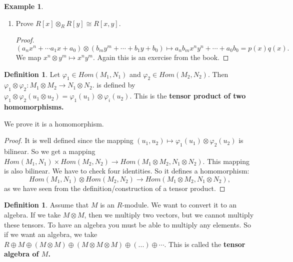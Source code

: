 \documentclass[12pt]{amsbook}
\theoremstyle{plain}
\numberwithin{section}{chapter}
\numberwithin{equation}{chapter}
\theoremstyle{definition}
\newtheorem{Def}[theorem]{Definition}
\newtheorem{Ex}[theorem]{Example}
\theoremstyle{remark}
\newcommand{\tens}{\otimes}
\renewcommand{\phi}{\varphi}
\begin{document}
\begin{Ex}
\begin{enumerate}
\begin{proof}
You need to check something like this:
$$
(\alpha_1 \tens (a_1x^n + \cdots + a_1x + a_0)) \cdot (\alpha_2 \tens (...)).
$$
The map would be given by: 
$$
\alpha_1 \tens (a_1x^n + \cdots + a_1x + a_0)\mapsto a_n\alpha x^n + \cdots a_1 \alpha x + a_0\alpha.
$$
Here it is just defined for simple tensors. So any polynomial of $S$ is the image of some tensor, since we have:
$$
\alpha_n \tens x^n + \cdots + \alpha_1 \tens x + \alpha_0 \tens 1 \mapsto \alpha_nx^n + \cdots + \alpha_1 x + \alpha_0.
$$
\end{proof}

\item Prove $R[x] \tens_R R[y] \cong R[x,y]$. 

\begin{proof}
$$
(a_nx^n + \cdots a_1 x + a_0) \tens (b_my^m + \cdots + b_1 y + b_0) \mapsto a_nb_mx^ny^n + \cdots + a_0b_0 = p(x)q(x).
$$
We map $x^n \tens y^m \mapsto x^n y^m$. Again this is an exercise from the book. 
\end{proof}

\end{enumerate}
\end{Ex}

\begin{Def}
Let $\phi_1 \in Hom(M_1,N_1)$ and $\phi_2 \in Hom(M_2,N_2)$. Then $\phi_1 \tens \phi_2: M_1 \tens M_2 \to N_1 \tens N_2$. is defined by $\phi_1 \tens \phi_2(u_1 \tens u_2) = \phi_1(u_1) \tens \phi_i(u_2)$. This is the \textbf{tensor product of two homomorphisms. }
\end{Def}
We prove it is a homomorphism. 
\begin{proof}
It is well defined since the mapping $(u_1,u_2) \mapsto \phi_1(u_1) \tens \phi_2(u_2)$ is bilinear. 
So we get a mapping $Hom(M_1,N_1) \times Hom(M_2,N_2) \to Hom(M_1 \tens M_2,N_1 \tens N_2)$. This mapping is also bilinear. We have to check four identities. So it defines a homomorphism: 
$$
Hom(M_1,N_1) \tens Hom(M_2,N_2) \to Hom(M_1 \tens M_2,N_1 \tens N_2),
$$
as we have seen from the definition/construction of a tensor product. 
\end{proof}

\begin{Def}
Assume that $M$ is an $R$-module. We want to convert it to an algebra. If we take $M \tens M$, then we multiply two vectors, but we cannot multiply these tensors. To have an algebra you must be able to multiply any elements. So if we want an algebra, we take $R \oplus M \oplus (M \tens M) \oplus (M \tens M \tens M) \oplus (...) \oplus \cdots$. 
This is called the \textbf{tensor algebra of $M$. }
\end{Def} \label{gradedalgebra}
\end{document}
